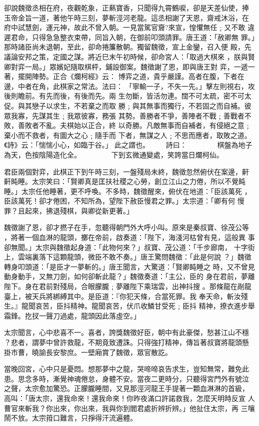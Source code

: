 \begin{pinyinscope}
{卻說魏徵丞相在府，夜觀乾象，正爇寶香，只聞得九霄鶴唳，卻是天差仙使，捧
玉帝金旨一道，著他午時三刻，夢斬涇河老龍。這丞相謝了天恩，齋戒沐浴，在
府中試慧劍，運元神，故此不曾入朝。一見當駕官齎?來宣，惶懼無任﹔又不敢
違遲君命，只得急急整衣束帶，同旨入朝，在御前叩頭請罪。唐王道：「赦卿無
罪。」那時諸臣尚未退朝，至此，卻命捲簾散朝。獨留魏徵，宣上金鑾，召入便
殿，先議論安邦之策，定國之謀。將近巳末午初時候，卻命宮人：「取過大棋來
，朕與賢卿對弈一局。」眾嬪妃隨取棋枰，鋪設御案。魏徵謝了恩，即與唐王對
弈，一遞一著，擺開陣勢。正合《爛柯經》云：
博弈之道，貴乎嚴謹。高者在腹，下者在邊，中者在角，此棋家之常法。法曰：
「寧輸一子，不失一先。」擊左則視右，攻後則瞻前。有先而後，有後而先。兩
生勿斷，皆活勿連。闊不可太疏，密不可太促。與其戀子以求生，不若棄之而取
勝﹔與其無事而獨行，不若固之而自補。彼眾我寡，先謀其生﹔我眾彼寡，務張
其勢。善勝者不爭，善陣者不戰﹔善戰者不敗，善敗者不亂。夫棋始以正合，終
以奇勝。凡敵無事而自補者，有侵絕之意﹔棄小而不救者，有圖大之心﹔隨手而
下者，無謀之人﹔不思而應者，取敗之道。《詩》云：「惴惴小心，如臨于谷。」
此之謂也。
　　詩曰：
　　　　棋盤為地子為天，色按陰陽造化全。
　　　　下到玄微通變處，笑誇當日爛柯仙。

君臣兩個對弈，此棋正下到午時三刻，一盤殘局未終，魏徵忽然俯伏在案邊，鼾
鼾盹睡。太宗笑曰：「賢卿真是匡扶社稷之心勞，創立江山之力倦，所以不覺盹
睡。」太宗任他睡著，更不呼喚。不多時，魏徵醒來，俯伏在地道：「臣該萬死
，臣該萬死！卻才倦困，不知所為，望陛下赦臣慢君之罪。」太宗道：「卿有何
慢罪？且起來，拂退殘棋，與卿從新更著。」

魏徵謝了恩，卻才撚子在手，忽聽得朝門外大呼小叫。原來是秦叔寶、徐茂公等
，將著一個血淋的龍頭，擲在帝前，啟奏道：「陛下，海淺河枯曾有見，這般異
事卻無聞。」太宗與魏徵起身道：「此物何來？」叔寶、茂公道：「千步廊南，
十字街上，雲端裏落下這顆龍頭，微臣不敢不奏。」唐王驚問魏徵：「此是何說
？」魏徵轉身叩頭道：「是臣才一夢斬的。」唐王聞言，大驚道：「賢卿盹睡之
時，又不曾見動身動手，又無刀劍，如何卻斬此龍？」魏徵奏道：「主公，臣的
身在君前，夢離陛下。身在君前對殘局，合眼朦朧﹔夢離陛下乘瑞雲，出神抖搜
。那條龍在剮龍臺上，被天兵將綁縛其中。是臣道：『你犯天條，合當死罪。我
奉天命，斬汝殘生。』龍聞哀苦，臣抖精神。龍聞哀苦，伏爪收鱗甘受死﹔臣抖
精神，撩衣進步舉霜鋒。扢扠一聲刀過處，龍頭因此落虛空。」

太宗聞言，心中悲喜不一。喜者，誇獎魏徵好臣，朝中有此豪傑，愁甚江山不穩
？悲者，謂夢中曾許救龍，不期竟致遭誅。只得強打精神，傳旨著叔寶將龍頭懸
掛市曹，曉諭長安黎庶。一壁廂賞了魏徵，眾官散訖。

當晚回宮，心中只是憂悶。想那夢中之龍，哭啼啼哀告求生，豈知無常，難免此
患。思念多時，漸覺神魂倦怠，身體不安。當夜二更時分，只聽得宮門外有號泣
之聲，太宗愈加驚恐。正朦朧睡間，又見那涇河龍王手提著一顆血淋淋的首級，
高叫：「唐太宗，還我命來！還我命來！你昨夜滿口許諾救我，怎麼天明時反宣
人曹官來斬我？你出來，你出來，我與你到閻君處折辨折辨。」他扯住太宗，再
三嚷鬧不放。太宗箝口難言，只掙得汗流遍體。

}
\end{pinyinscope}
